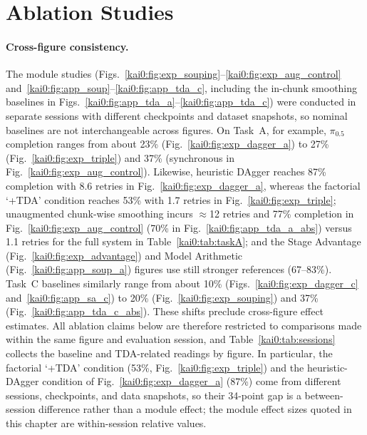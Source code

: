 \section{Ablation Studies}\label{kai0:sec:ablation}

\paragraph{Cross-figure consistency.} The module studies (Figs.~\ref{kai0:fig:exp_souping}--\ref{kai0:fig:exp_aug_control} and~\ref{kai0:fig:app_soup}--\ref{kai0:fig:app_tda_c}, including the in-chunk smoothing baselines in Figs.~\ref{kai0:fig:app_tda_a}--\ref{kai0:fig:app_tda_c}) were conducted in separate sessions with different checkpoints and dataset snapshots, so nominal baselines are not interchangeable across figures. On Task~A, for example, $\pi_{0.5}$ completion ranges from about 23\% (Fig.~\ref{kai0:fig:exp_dagger_a}) to 27\% (Fig.~\ref{kai0:fig:exp_triple}) and 37\% (synchronous in Fig.~\ref{kai0:fig:exp_aug_control}). Likewise, heuristic DAgger reaches 87\% completion with 8.6 retries in Fig.~\ref{kai0:fig:exp_dagger_a}, whereas the factorial `+TDA' condition reaches 53\% with 1.7 retries in Fig.~\ref{kai0:fig:exp_triple}; unaugmented chunk-wise smoothing incurs $\approx$12 retries and 77\% completion in Fig.~\ref{kai0:fig:exp_aug_control} (70\% in Fig.~\ref{kai0:fig:app_tda_a_abs}) versus 1.1 retries for the full system in Table~\ref{kai0:tab:taskA}; and the Stage Advantage (Fig.~\ref{kai0:fig:exp_advantage}) and Model Arithmetic (Fig.~\ref{kai0:fig:app_soup_a}) figures use still stronger references (67--83\%). Task~C baselines similarly range from about 10\% (Figs.~\ref{kai0:fig:exp_dagger_c} and~\ref{kai0:fig:app_sa_c}) to 20\% (Fig.~\ref{kai0:fig:exp_souping}) and 37\% (Fig.~\ref{kai0:fig:app_tda_c_abs}). These shifts preclude cross-figure effect estimates. All ablation claims below are therefore restricted to comparisons made within the same figure and evaluation session, and Table~\ref{kai0:tab:sessions} collects the baseline and TDA-related readings by figure. In particular, the factorial `+TDA' condition (53\%, Fig.~\ref{kai0:fig:exp_triple}) and the heuristic-DAgger condition of Fig.~\ref{kai0:fig:exp_dagger_a} (87\%) come from different sessions, checkpoints, and data snapshots, so their 34-point gap is a between-session difference rather than a module effect; the module effect sizes quoted in this chapter are within-session relative values.

